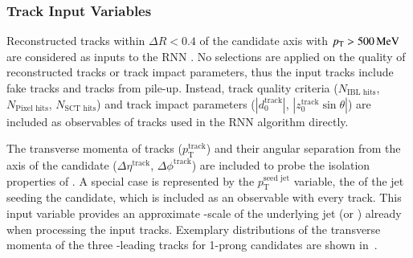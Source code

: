 \subsubsection{Track Input Variables}

Reconstructed tracks within $\Delta R < 0.4$ of the \tauhadvis
candidate axis with $p_{\text{T}} > \SI{500}{\ensuremath{\text{MeV}}}$ are considered as inputs to
the RNN \tauid. No selections are applied on the quality of
reconstructed tracks or track impact parameters, thus the input tracks
include fake tracks and tracks from pile-up. Instead, track quality
criteria ($N_{\text{IBL hits}}$, $N_{\text{Pixel hits}}$,
$N_{\text{SCT hits}}$) and track impact parameters
($|d_0^{\text{track}}|$, $|z_0^{\text{track}} \sin\theta|$) are
included as observables of tracks used in the RNN \tauid algorithm
directly.

The transverse momenta of tracks ($p_{\text{T}}^{\text{track}}$) and
their angular separation from the axis of the \tauhadvis candidate
($\Delta \eta^{\text{track}}$, $\Delta \phi^{\text{track}}$) are
included to probe the isolation properties of \tauhadvis. A special
case is represented by the $p_{\text{T}}^{\text{seed jet}}$ variable,
the \pT of the jet seeding the \tauhadvis candidate, which is included
as an observable with every track. This input variable provides an
approximate \pT-scale of the underlying jet (or \tauhadvis) already
when processing the input tracks. Exemplary distributions of the
transverse momenta of the three \pT-leading tracks for 1-prong
\tauhadvis candidates are shown
in~.

